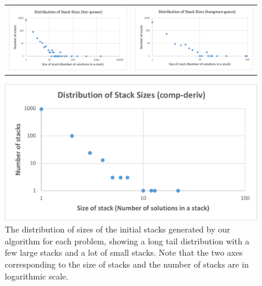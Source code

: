 \documentclass[12pt,twoside]{mitthesis}
\begin{document}
\begin{figure}
\centering
\begin{tabular}{c c}
\includegraphics[scale=0.30]{Body/figures/overcode/stacksdistr-iter-power}
&
\includegraphics[scale=0.405]{Body/figures/overcode/stacksdistr-hangman}
\end{tabular}
\includegraphics[scale=0.38]{Body/figures/overcode/stacksdistr-comp-deriv}
\caption{The distribution of sizes of the initial stacks generated by our algorithm for each problem, showing a long tail distribution with a few large stacks and a lot of small stacks. Note that the two axes corresponding to the size of stacks and the number of stacks are in logarithmic scale.}
\label{stackdistribution}
\end{figure}
\end{document}

